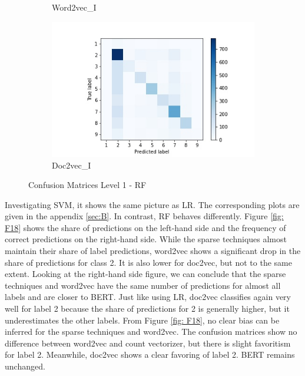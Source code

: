 \documentclass[12pt, a4paper, titlepage]{article}
\begin{document}
\begin{figure}[hb!]
\begin{subfigure}[b]{0.475\textwidth}
    {{\small Word2vec\_I}}    
  \end{subfigure}
  \hfill
  \begin{subfigure}[b]{0.475\textwidth}   
      \centering 
      \includegraphics[width=\textwidth]{cm_doc2vec_without_RF.jpg}
      {{\small Doc2vec\_I}}    
  \end{subfigure}
  \caption{\label{fig: F20} Confusion Matrices Level 1 - RF}
\end{figure}

Investigating \ac{SVM}, it shows the same picture as \ac{LR}. The corresponding plots are given in the appendix \ref{sec:B}. In contrast, \ac{RF} behaves differently. Figure \ref{fig: F18} shows the share of predictions on the left-hand side and the frequency of correct predictions on the right-hand side. While the sparse techniques almost maintain their share of label predictions, word2vec shows a significant drop in the share of predictions for class 2. It is also lower for doc2vec, but not to the same extent. Looking at the right-hand side figure, we can conclude that the sparse techniques and word2vec have the same number of predictions for almost all labels and are closer to \ac{BERT}. Just like using \ac{LR}, doc2vec classifies again very well for label 2 because the share of predictions for 2 is generally higher, but it underestimates the other labels. From Figure \ref{fig: F18}, no clear bias can be inferred for the sparse techniques and word2vec. The confusion matrices show no difference between word2vec and count vectorizer, but there is slight favoritism for label 2. Meanwhile, doc2vec shows a clear favoring of label 2. \ac{BERT} remains unchanged.
\end{document}
